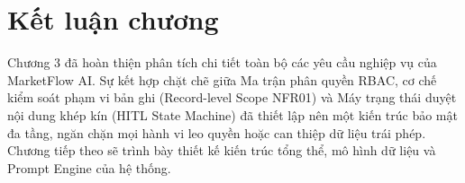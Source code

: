 \section{Kết luận chương}

Chương 3 đã hoàn thiện phân tích chi tiết toàn bộ các yêu cầu nghiệp vụ của MarketFlow AI. Sự kết hợp chặt chẽ giữa Ma trận phân quyền RBAC, cơ chế kiểm soát phạm vi bản ghi (Record-level Scope NFR01) và Máy trạng thái duyệt nội dung khép kín (HITL State Machine) đã thiết lập nên một kiến trúc bảo mật đa tầng, ngăn chặn mọi hành vi leo quyền hoặc can thiệp dữ liệu trái phép. Chương tiếp theo sẽ trình bày thiết kế kiến trúc tổng thể, mô hình dữ liệu và Prompt Engine của hệ thống.

